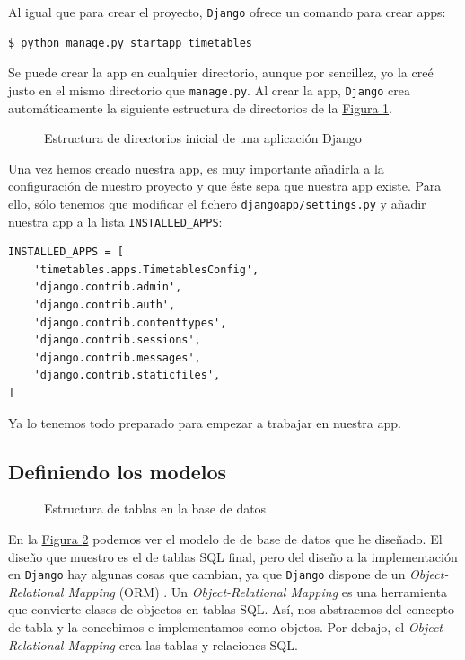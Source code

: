 Al igual que para crear el proyecto, \texttt{Django} ofrece un comando para crear apps:

\begin{verbatim}
$ python manage.py startapp timetables
\end{verbatim}

Se puede crear la app en cualquier directorio, aunque por sencillez, yo la creé justo en el mismo directorio que \texttt{manage.py}. Al crear la app, \texttt{Django} crea automáticamente la siguiente estructura de directorios de la \hyperref[djangoappfolders]{Figura \ref*{djangoappfolders}}.

\begin{figure}
\centering
\scalebox{.7}{}
\caption{Estructura de directorios inicial de una aplicación Django}
\label{djangoappfolders}
\end{figure}

Una vez hemos creado nuestra app, es muy importante añadirla a la configuración de nuestro proyecto y que éste sepa que nuestra app existe. Para ello, sólo tenemos que modificar el fichero \texttt{djangoapp/settings.py} y añadir nuestra app a la lista \texttt{INSTALLED\_APPS}:

\newpage
\begin{verbatim}
INSTALLED_APPS = [
    'timetables.apps.TimetablesConfig',
    'django.contrib.admin',
    'django.contrib.auth',
    'django.contrib.contenttypes',
    'django.contrib.sessions',
    'django.contrib.messages',
    'django.contrib.staticfiles',
]
\end{verbatim}

Ya lo tenemos todo preparado para empezar a trabajar en nuestra app.

\subsection{Definiendo los modelos}
\begin{figure}
\centering
\scalebox{.7}{}
\caption{Estructura de tablas en la base de datos}
\label{djangomodels}
\end{figure}

En la \hyperref[djangomodels]{Figura \ref*{djangomodels}} podemos ver el modelo de de base de datos que he diseñado. El diseño que muestro es el de tablas SQL final, pero del diseño a la implementación en \texttt{Django} hay algunas cosas que cambian, ya que \texttt{Django} dispone de un \textit{Object-Relational Mapping} (ORM) \cite{orm}. Un \textit{Object-Relational Mapping} es una herramienta que convierte clases de objectos en tablas SQL. Así, nos abstraemos del concepto de tabla y la concebimos e implementamos como objetos. Por debajo, el \textit{Object-Relational Mapping} crea las tablas y relaciones SQL.

